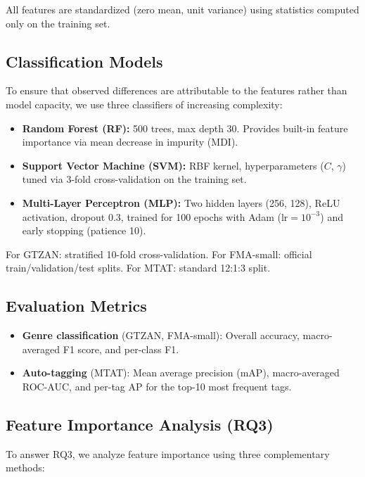 \documentclass[conference]{IEEEtran}
\begin{document}
All features are standardized (zero mean, unit variance) using statistics computed only on the training set.

\subsection{Classification Models}

To ensure that observed differences are attributable to the features rather than model capacity, we use three classifiers of increasing complexity:

\begin{itemize}
    \item \textbf{Random Forest (RF):} 500 trees, max depth 30. Provides built-in feature importance via mean decrease in impurity (MDI).
    \item \textbf{Support Vector Machine (SVM):} RBF kernel, hyperparameters ($C$, $\gamma$) tuned via 3-fold cross-validation on the training set.
    \item \textbf{Multi-Layer Perceptron (MLP):} Two hidden layers (256, 128), ReLU activation, dropout 0.3, trained for 100 epochs with Adam ($\text{lr} = 10^{-3}$) and early stopping (patience 10).
\end{itemize}

For GTZAN: stratified 10-fold cross-validation.
For FMA-small: official train/validation/test splits.
For MTAT: standard 12:1:3 split.

\subsection{Evaluation Metrics}

\begin{itemize}
    \item \textbf{Genre classification} (GTZAN, FMA-small): Overall accuracy, macro-averaged F1 score, and per-class F1.
    \item \textbf{Auto-tagging} (MTAT): Mean average precision (mAP), macro-averaged ROC-AUC, and per-tag AP for the top-10 most frequent tags.
\end{itemize}

\subsection{Feature Importance Analysis (RQ3)}

To answer RQ3, we analyze feature importance using three complementary methods:
\end{document}
